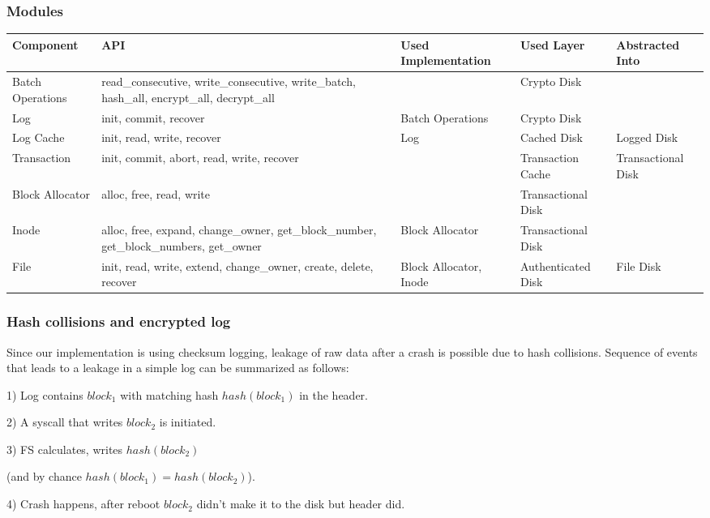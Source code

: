 \documentclass[onecolumn]{paper}
\begin{document}
		\subsubsection{Modules}
		\begin{tabularx}{\linewidth}{|L|L|L|L|L|}
		\hline
		Component & API & Used Implementation &	Used Layer & Abstracted Into \\
		\hline
		Batch Operations &
		read\_consecutive, write\_consecutive,
		write\_batch, hash\_all,
		encrypt\_all, decrypt\_all &
		& 
		Crypto Disk & 
		\\
		\hline
		Log &
		init, commit, recover &
		Batch Operations &
		Crypto Disk & 
		\\
		\hline
		Log Cache &
		init,
		read, 
		write, 
		recover &
		Log &
		Cached Disk &
		Logged Disk \\
		\hline
		Transaction &
		init, commit, abort, 
		read, write, recover &
		&
		Transaction Cache &
		Transactional Disk \\
		\hline
		Block Allocator &
		alloc, free, read, write &
		&
		Transactional Disk &
		\\
		\hline
		Inode &
		alloc, free, expand, change\_owner, get\_block\_number, get\_block\_numbers, get\_owner &
		Block Allocator &
		Transactional Disk &
		\\
		\hline
		File &
		init, read, write, extend, change\_owner, create, delete, recover &
		Block Allocator, Inode &
		Authenticated Disk &
		File Disk \\
		\hline
	\end{tabularx}

	\subsubsection{Hash collisions and encrypted log}
		Since our implementation is using checksum logging, leakage of raw data after a crash is possible due to hash collisions. Sequence of events that leads to a leakage in a simple log can be summarized as follows:
		
		1) Log contains $block_1$ with matching hash $hash(block_1)$ in the header.
		
		2) A syscall that writes $block_2$ is initiated.
		
		3) FS calculates, writes $hash(block_2)$ 
		
		  (and by chance $hash(block_1) = hash(block_2)$).
		  
		4) Crash happens, after reboot $block_2$ didn't make it to the disk but header did.
		
\end{document}

